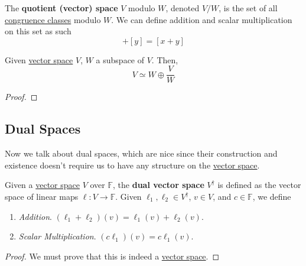   \begin{definition}
    \label{def:quotient-vector-space}
    The \textbf{quotient (vector) space} $V$ modulo $W$, denoted $V/W$, is the set of all \hyperref[dg-def:congruence-classes]{congruence classes} modulo $W$. We can define addition and scalar multiplication on this set as such 
    \begin{equation}
      [x] + [y] = [x + y]
    \end{equation}
  \end{definition}

  \begin{theorem}
    \label{thm:decomposition-into-subspace-and-quotient-space}
    Given \hyperref[def:vector-space]{vector space} $V$, $W$ a subspace of $V$. Then, 
    \begin{equation}
      V \simeq W \oplus \frac{V}{W}
    \end{equation}
  \end{theorem}
  \begin{proof}
    
  \end{proof}

\subsection{Dual Spaces}

  Now we talk about dual spaces, which are nice since their construction and existence doesn't require us to have any structure on the \hyperref[def:vector-space]{vector space}. 

  \begin{definition}
    \label{def:dual-space}
    Given a \hyperref[def:vector-space]{vector space} $V$ over $\mathbb{F}$, the \textbf{dual vector space} $V^\dagger$ is defined as the vector space of linear maps $\ell: V \to \mathbb{F}$. Given $\ell_1, \ell_2 \in V^\dagger$, $v \in V$, and $c \in \mathbb{F}$, we define
    \begin{enumerate}
      \item \textit{Addition}. $(\ell_1 + \ell_2)(v) = \ell_1 (v) + \ell_2 (v)$. 
      \item \textit{Scalar Multiplication}. $(c \ell_1)(v) = c \ell_1 (v)$. 
    \end{enumerate}
  \end{definition}
  \begin{proof}
    We must prove that this is indeed a \hyperref[def:vector-space]{vector space}. 
  \end{proof}

